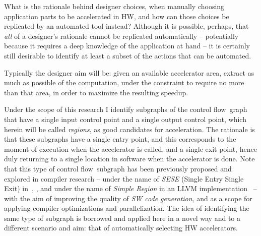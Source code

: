 \documentclass[]{usiinfthesis}
\newcommand{\controlflow}{control flow}
\begin{document}
What is the rationale behind designer choices, when manually choosing
application parts to be accelerated in HW, and how can those choices
be replicated by an automated tool instead? Although it is possible,
perhaps, that \emph{all} of a designer's rationale cannot be
replicated automatically -- potentially because it requires a deep
knowledge of the application at hand -- it is certainly still
desirable to identify at least a subset of the actions that can be
automated.\par

Typically the designer aim will be: given an available accelerator
area, extract as much as possible of the computation, under the
constraint to require no more than that area, in order to maximize the
resulting speedup.\par 

Under the scope of this research I identify subgraphs of the \controlflow\ 
graph that have a single input control point and a single output control point, 
which herein will be called \emph{regions}, as good candidates for 
acceleration. The rationale
is that these subgraphs have a single entry point, and this
corresponds to the moment of execution when the accelerator is called,
and a single exit point, hence duly returning to a single location in
software when the accelerator is done. Note that this type of
\controlflow\ subgraph has been previously proposed and explored in
compiler research -- under the name of \emph{SESE} (Single Entry
Single Exit) in~\cite{AguilarJune16}, \cite{JohnsonJun94}, and under
the name of \emph{Simple Region} in an LLVM
implementation~\cite{LattnerMar04} -- with the aim of improving the
quality of \emph{SW code generation}, and as a scope for applying
compiler optimizations and parallelization. The idea of
identifying the same type of subgraph is borrowed and applied here in a 
novel way and to a different scenario and aim: that of automatically 
selecting HW accelerators.\par
\end{document}
